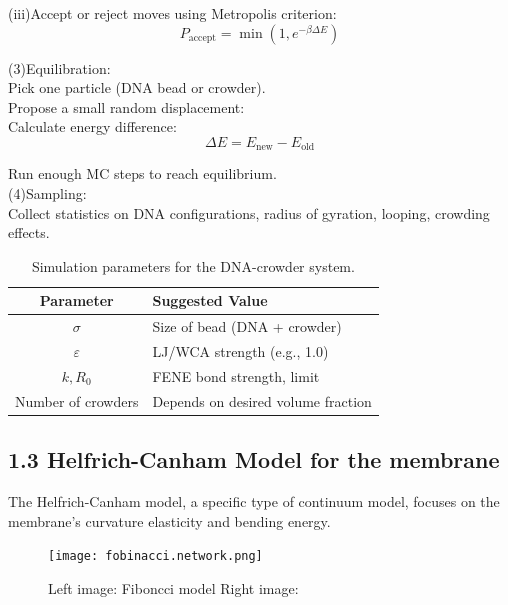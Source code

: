\documentclass[12pt]{article}
\begin{document}
\begin{flushleft}
(iii)Accept or reject moves using Metropolis criterion:
\begin{equation}
P_{\text{accept}} = \min \left(1, e^{-\beta \Delta E}\right)
\end{equation}

\setlength{\parindent}{4em} (3)Equilibration:\\

Pick one particle (DNA bead or crowder).\\
Propose a small random displacement:\\
Calculate energy difference:
\begin{equation}
\Delta E = E_{\text{new}} - E_{\text{old}}
\end{equation}

\setlength{\parindent}{6em} Run enough MC steps to reach equilibrium.\\
\setlength{\parindent}{4em}  (4)Sampling:\\
\setlength{\parindent}{6em} Collect statistics on DNA configurations, radius of gyration, looping, crowding effects.\\




\begin{table}[htbp]
\centering
\begin{tabular}{|c|l|}
\hline
\textbf{Parameter} & \textbf{Suggested Value} \\
\hline
$\sigma$ & Size of bead (DNA + crowder) \\
\hline
$\varepsilon$ & LJ/WCA strength (e.g., 1.0) \\
\hline
$k, R_0$ & FENE bond strength, limit \\
\hline
Number of crowders & Depends on desired volume fraction \\
\hline
\end{tabular}
\caption{Simulation parameters for the DNA-crowder system.}
\end{table}







\subsection*{ 1.3 Helfrich-Canham Model for the membrane}

The Helfrich-Canham model, a specific type of continuum model, focuses on the membrane's curvature elasticity and bending energy\cite{Bassereau2014}.
\begin{figure}[!ht]
  \centering
  \texttt{[image: fobinacci.network.png]} 
  \caption{Left image: Fiboncci model  Right image: }
\end{figure}


\end{flushleft}
\end{document}
